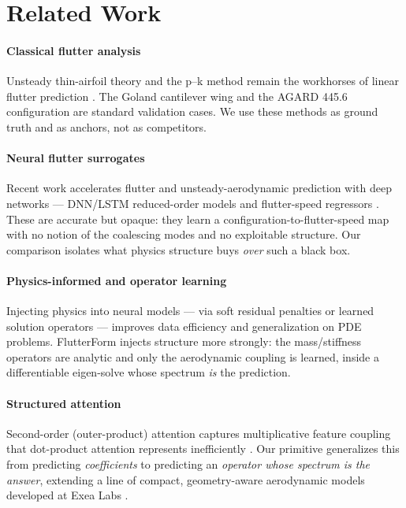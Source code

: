 \documentclass{article}
\begin{document}
\section{Related Work}
\paragraph{Classical flutter analysis} Unsteady thin-airfoil theory
\citep{theodorsen1935} and the p--k method \citep{hassig1971} remain the workhorses
of linear flutter prediction \citep{bisplinghoff1955,hodges2011}. The Goland
cantilever wing \citep{goland1945} and the AGARD 445.6 configuration
\citep{yates1987} are standard validation cases. We use these methods as ground
truth and as anchors, not as competitors.

\paragraph{Neural flutter surrogates} Recent work accelerates flutter and
unsteady-aerodynamic prediction with deep networks --- DNN/LSTM reduced-order
models and flutter-speed regressors \citep{panelflutter2024,transoniclstm2020}.
These are accurate but opaque: they learn a configuration-to-flutter-speed map
with no notion of the coalescing modes and no exploitable structure. Our
comparison isolates what physics structure buys \emph{over} such a black box.

\paragraph{Physics-informed and operator learning} Injecting physics into neural
models --- via soft residual penalties \citep{raissi2019} or learned solution
operators \citep{li2021fno} --- improves data efficiency and generalization on
PDE problems. FlutterForm injects structure more strongly: the mass/stiffness
operators are analytic and only the aerodynamic coupling is learned, inside a
differentiable eigen-solve whose spectrum \emph{is} the prediction.

\paragraph{Structured attention} Second-order (outer-product) attention captures
multiplicative feature coupling that dot-product attention represents
inefficiently \citep{vaswani2017}. Our primitive generalizes this from predicting
\emph{coefficients} to predicting an \emph{operator whose spectrum is the answer},
extending a line of compact, geometry-aware aerodynamic models developed at Exea
Labs \citep{foilcore,foilform,sdformer}.
\end{document}
